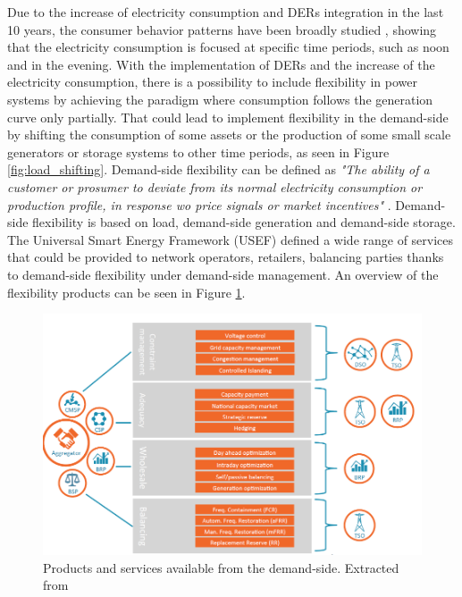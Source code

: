 Due to the increase of electricity consumption and DERs integration in the last 10 years, the consumer behavior patterns have been broadly studied \cite{ZHOU201773,TORRITI2014265}, showing that the electricity consumption is focused at specific time periods, such as noon and in the evening. With the implementation of DERs and the increase of the electricity consumption, there is a possibility to include flexibility in power systems by achieving the paradigm where consumption follows the generation curve only partially. That could lead to implement flexibility in the demand-side by shifting the consumption of some assets or the production of some small scale generators or storage systems to other time periods, as seen in Figure \ref{fig:load_shifting}. Demand-side flexibility can be defined as \textit{"The ability of a customer or prosumer to deviate from its normal electricity consumption or production profile, in response wo price signals or market incentives"} \cite{EuropeanSmartGridsTaskForceExpertGroup32019}. Demand-side flexibility is based on load, demand-side generation and demand-side storage. The Universal Smart Energy Framework (USEF) defined a wide range of services that could be provided to network operators, retailers, balancing parties thanks to demand-side flexibility under demand-side management. An overview of the flexibility products can be seen in Figure \ref{fig:DSF}. 

\begin{figure}[h]
	\centering 
	\includegraphics[width=1\columnwidth ]{ChapterIntro/Figures/USEF_DSF.png}
		\caption{Products and services available from the demand-side. Extracted from \cite{USEFFoundation2015a}}  
		\label{fig:DSF}
\end{figure}


